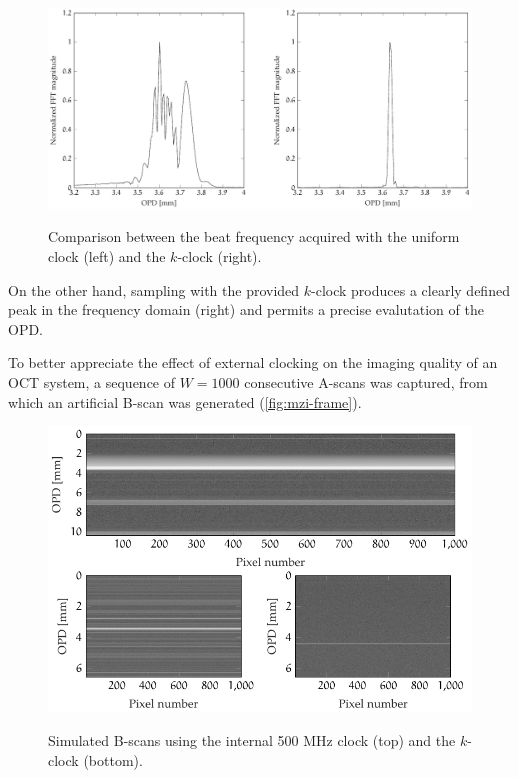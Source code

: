 \begin{figure}[hbt]
	{\myfloatalign
		\includegraphics[width=\linewidth]{gfx/ch3/interferometer/interferometer}}
	\caption{Comparison between the beat frequency acquired with the uniform clock (left) and the $k$-clock (right).}\label{fig:mzi-comparison}
\end{figure}

On the other hand, sampling with the provided $k$-clock produces a clearly defined peak in the frequency domain (right) and permits a precise evalutation of the OPD. 

To better appreciate the effect of external clocking on the imaging quality of an OCT system, a sequence of $W = 1000$ consecutive A-scans was captured, from which an artificial B-scan was generated (\autoref{fig:mzi-frame}). 


\begin{figure}[hbt]
	{\myfloatalign
		\includegraphics[width=\linewidth]{gfx/ch3/interferometer/interferometer-frame}}
	\caption{Simulated B-scans using the internal 500 MHz clock (top) and the $k$-clock (bottom).}\label{fig:mzi-frame}
\end{figure}

